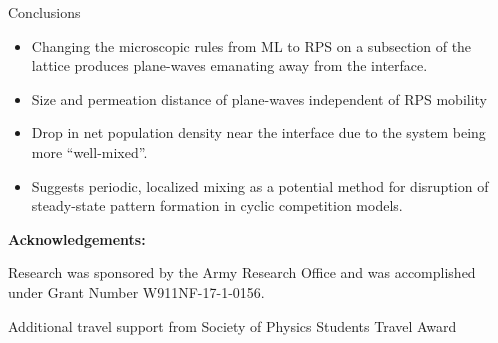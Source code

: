 \documentclass[aspectratio=169]{beamer}
\begin{document}

    \begin{frame}[t]{Conclusions}
                
        \begin{itemize}
            \item Changing the microscopic rules from ML to RPS on a subsection of the lattice
                produces plane-waves emanating away from the interface.
            \item Size and permeation distance of plane-waves independent of RPS
                mobility
            \item Drop in net population density near the interface due to the system
                being more ``well-mixed''.
            \item Suggests periodic, localized mixing as a potential method for disruption 
                of steady-state pattern formation in cyclic competition models.
        \end{itemize}

            \vspace{10pt}

            \footnotesize {
                \textbf{Acknowledgements:}
                
                Research was sponsored by the Army Research Office and was
                accomplished under Grant Number W911NF-17-1-0156.


                Additional travel support from Society of Physics Students Travel Award
            }

    \end{frame}
\end{document}

